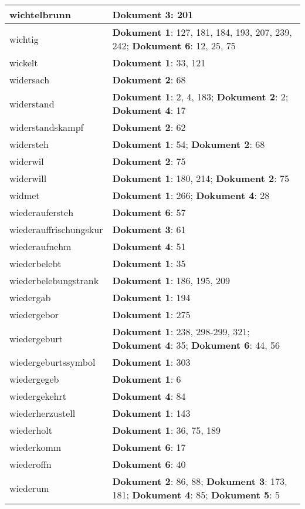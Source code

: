 \documentclass[a5paper]{article}
\begin{document}
\begin{longtable}[l]{|l|p{3in}|}
\hline
wichtelbrunn & \textbf{Dokument 3}: 201 \\
\hline
wichtig & \textbf{Dokument 1}: 127, 181, 184, 193, 207, 239, 242; \textbf{Dokument 6}: 12, 25, 75 \\
\hline
wickelt & \textbf{Dokument 1}: 33, 121 \\
\hline
widersach & \textbf{Dokument 2}: 68 \\
\hline
widerstand & \textbf{Dokument 1}: 2, 4, 183; \textbf{Dokument 2}: 2; \textbf{Dokument 4}: 17 \\
\hline
widerstandskampf & \textbf{Dokument 2}: 62 \\
\hline
widersteh & \textbf{Dokument 1}: 54; \textbf{Dokument 2}: 68 \\
\hline
widerwil & \textbf{Dokument 2}: 75 \\
\hline
widerwill & \textbf{Dokument 1}: 180, 214; \textbf{Dokument 2}: 75 \\
\hline
widmet & \textbf{Dokument 1}: 266; \textbf{Dokument 4}: 28 \\
\hline
wiederaufersteh & \textbf{Dokument 6}: 57 \\
\hline
wiederauffrischungskur & \textbf{Dokument 3}: 61 \\
\hline
wiederaufnehm & \textbf{Dokument 4}: 51 \\
\hline
wiederbelebt & \textbf{Dokument 1}: 35 \\
\hline
wiederbelebungstrank & \textbf{Dokument 1}: 186, 195, 209 \\
\hline
wiedergab & \textbf{Dokument 1}: 194 \\
\hline
wiedergebor & \textbf{Dokument 1}: 275 \\
\hline
wiedergeburt & \textbf{Dokument 1}: 238, 298-299, 321; \textbf{Dokument 4}: 35; \textbf{Dokument 6}: 44, 56 \\
\hline
wiedergeburtssymbol & \textbf{Dokument 1}: 303 \\
\hline
wiedergegeb & \textbf{Dokument 1}: 6 \\
\hline
wiedergekehrt & \textbf{Dokument 4}: 84 \\
\hline
wiederherzustell & \textbf{Dokument 1}: 143 \\
\hline
wiederholt & \textbf{Dokument 1}: 36, 75, 189 \\
\hline
wiederkomm & \textbf{Dokument 6}: 17 \\
\hline
wiederoffn & \textbf{Dokument 6}: 40 \\
\hline
wiederum & \textbf{Dokument 2}: 86, 88; \textbf{Dokument 3}: 173, 181; \textbf{Dokument 4}: 85; \textbf{Dokument 5}: 5 \\

\end{longtable}
\end{document}

